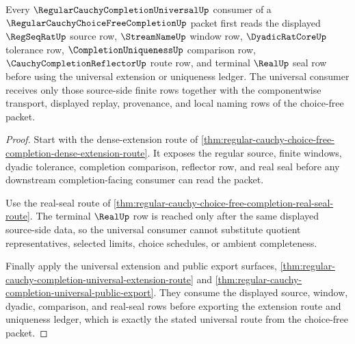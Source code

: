 \begin{theorem}
\label{thm:regular-cauchy-choice-free-completion-universal-route}
Every $\RegularCauchyCompletionUniversalUp$ consumer of a $\RegularCauchyChoiceFreeCompletionUp$ packet first reads the displayed $\RegSeqRatUp$ source row, $\StreamNameUp$ window row, $\DyadicRatCoreUp$ tolerance row, $\CompletionUniquenessUp$ comparison row, $\CauchyCompletionReflectorUp$ route row, and terminal $\RealUp$ seal row before using the universal extension or uniqueness ledger. The universal consumer receives only those source-side finite rows together with the componentwise transport, displayed replay, provenance, and local naming rows of the choice-free packet.
\end{theorem}
\begin{proof}
Start with the dense-extension route of \autoref{thm:regular-cauchy-choice-free-completion-dense-extension-route}. It exposes the regular source, finite windows, dyadic tolerance, completion comparison, reflector row, and real seal before any downstream completion-facing consumer can read the packet.

Use the real-seal route of \autoref{thm:regular-cauchy-choice-free-completion-real-seal-route}. The terminal $\RealUp$ row is reached only after the same displayed source-side data, so the universal consumer cannot substitute quotient representatives, selected limits, choice schedules, or ambient completeness.

Finally apply the universal extension and public export surfaces, \autoref{thm:regular-cauchy-completion-universal-extension-route} and \autoref{thm:regular-cauchy-completion-universal-public-export}. They consume the displayed source, window, dyadic, comparison, and real-seal rows before exporting the extension route and uniqueness ledger, which is exactly the stated universal route from the choice-free packet.
\end{proof}
